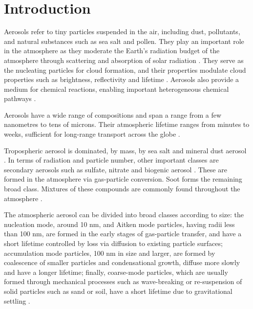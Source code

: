 
\chapter{Introduction}  %

\ifpdf
    \graphicspath{{Chapter1/Figs/Raster/}{Chapter1/Figs/PDF/}{Chapter1/Figs/}}
\else
    \graphicspath{{Chapter1/Figs/Vector/}{Chapter1/Figs/}}
\fi



Aerosols refer to tiny particles suspended in the air, including dust, pollutants, and natural substances such as sea salt and pollen. They play an important role in the atmosphere as they moderate the Earth's radiation budget of the atmosphere through scattering and absorption of solar radiation \citep{szopaShortlivedClimateForcers2021}.  They serve as the nucleating particles for cloud formation, and their properties modulate cloud properties such as brightness, reflectivity and lifetime \citep{boucherCloudsAerosols2014}.  Aerosols also provide a medium for chemical reactions, enabling important heterogeneous chemical pathways \citep{seinfeldAtmosphericChemistryPhysics2016}.

Aerosols have a wide range of compositions and span a range from a few nanometres to tens of microns.  Their atmospheric lifetime ranges from minutes to weeks, sufficient for long-range transport across the globe \citep{liScatteringAbsorbingAerosols2022}.  

Tropospheric aerosol is dominated, by mass, by sea salt and mineral dust aerosol \citep{szopaShortlivedClimateForcers2021}.  In terms of radiation and particle number, other important classes are secondary aerosols such as sulfate, nitrate and biogenic aerosol \citep{liScatteringAbsorbingAerosols2022}. These are formed in the atmosphere via gas-particle conversion.  Soot forms the remaining broad class.  Mixtures of these compounds are commonly found throughout the atmosphere \citep[e.g.][]{jimenezEvolutionOrganicAerosols2009, bauerTurningPointAerosol2022}.

The atmospheric aerosol can be divided into broad classes according to size: the nucleation mode, around 10 nm, and Aitken mode particles, having radii less than 100 nm, are formed in the early stages of gas-particle transfer, and have a short lifetime controlled by loss via diffusion to existing particle surfaces; accumulation mode particles, 100 nm in size and larger, are formed by coalescence of smaller particles and condensational growth, diffuse more slowly and have a longer lifetime; finally, coarse-mode particles, which are usually formed through mechanical processes such as wave-breaking or re-suspension of solid particles such as sand or soil, have a short lifetime due to gravitational settling \citep{seinfeldAtmosphericChemistryPhysics2016}.

